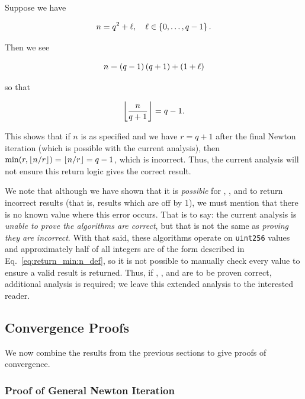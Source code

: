 Suppose we have

\begin{equation}
    n = q^{2} + \ell, \quad\ell\in\left\{ 0,\dots,q-1 \right\}.
    \label{eq:return_min:n_def}
\end{equation}

\noindent
Then we see

\begin{equation}
    n = \left( q-1 \right)\left( q+1 \right) + \left( 1+\ell \right)
\end{equation}

\noindent
so that

\begin{equation}
    \left\lfloor \frac{n}{q+1} \right\rfloor = q-1.
\end{equation}

\noindent
This shows that if $n$ is as specified and we have $r=q+1$
after the final Newton iteration (which is possible with the current analysis),
then $\min(r, \left\lfloor n/r \right\rfloor) = \left\lfloor n/r \right\rfloor = q-1$, which is incorrect.
Thus, the current analysis will not ensure this return logic
gives the correct result.

We note that although we have shown that it is \emph{possible} for
\prb{}, \OpenZeppelin{}, and \abdk{}
to return incorrect results (that is, results which are off by 1),
we must mention that there is no known value where this error occurs.
That is to say: the current analysis is \emph{unable to prove
the algorithms are correct},
but that is not the same as \emph{proving they are incorrect}.
With that said, these algorithms operate on \texttt{uint256}
values and approximately half of all integers are of the form described
in Eq.~\eqref{eq:return_min:n_def},
so it is not possible to manually check every value
to ensure a valid result is returned.
Thus, if \prb{}, \OpenZeppelin{}, and \abdk{} are to be proven correct,
additional analysis is required;
we leave this extended analysis to the interested reader.


\subsection{Convergence Proofs}

We now combine the results from the previous sections
to give proofs of convergence.

\subsubsection{Proof of General Newton Iteration}
\label{proof:general_newton}

